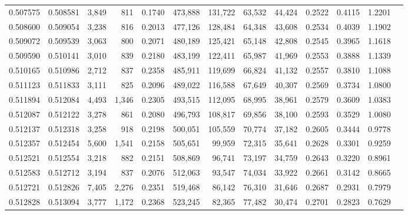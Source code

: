 \begin{tabular}{rrrrrrrrrrrrr}
0.507575 & 0.508581 &  3,849 &   811 &                                     0.1740 & 473,888 & 131,722 &  63,532 &  44,424 & 0.2522 & 0.4115 & 1.2201 \\
0.508600 & 0.509054 &  3,238 &   816 &                                     0.2013 & 477,126 & 128,484 &  64,348 &  43,608 & 0.2534 & 0.4039 & 1.1902 \\
0.509072 & 0.509539 &  3,063 &   800 &                                     0.2071 & 480,189 & 125,421 &  65,148 &  42,808 & 0.2545 & 0.3965 & 1.1618 \\
0.509590 & 0.510141 &  3,010 &   839 &                                     0.2180 & 483,199 & 122,411 &  65,987 &  41,969 & 0.2553 & 0.3888 & 1.1339 \\
0.510165 & 0.510986 &  2,712 &   837 &                                     0.2358 & 485,911 & 119,699 &  66,824 &  41,132 & 0.2557 & 0.3810 & 1.1088 \\
0.511123 & 0.511833 &  3,111 &   825 &                                     0.2096 & 489,022 & 116,588 &  67,649 &  40,307 & 0.2569 & 0.3734 & 1.0800 \\
0.511894 & 0.512084 &  4,493 & 1,346 &                                     0.2305 & 493,515 & 112,095 &  68,995 &  38,961 & 0.2579 & 0.3609 & 1.0383 \\
0.512087 & 0.512122 &  3,278 &   861 &                                     0.2080 & 496,793 & 108,817 &  69,856 &  38,100 & 0.2593 & 0.3529 & 1.0080 \\
0.512137 & 0.512318 &  3,258 &   918 &                                     0.2198 & 500,051 & 105,559 &  70,774 &  37,182 & 0.2605 & 0.3444 & 0.9778 \\
0.512357 & 0.512454 &  5,600 & 1,541 &                                     0.2158 & 505,651 &  99,959 &  72,315 &  35,641 & 0.2628 & 0.3301 & 0.9259 \\
0.512521 & 0.512554 &  3,218 &   882 &                                     0.2151 & 508,869 &  96,741 &  73,197 &  34,759 & 0.2643 & 0.3220 & 0.8961 \\
0.512583 & 0.512712 &  3,194 &   837 &                                     0.2076 & 512,063 &  93,547 &  74,034 &  33,922 & 0.2661 & 0.3142 & 0.8665 \\
0.512721 & 0.512826 &  7,405 & 2,276 &                                     0.2351 & 519,468 &  86,142 &  76,310 &  31,646 & 0.2687 & 0.2931 & 0.7979 \\
0.512828 & 0.513094 &  3,777 & 1,172 &                                     0.2368 & 523,245 &  82,365 &  77,482 &  30,474 & 0.2701 & 0.2823 & 0.7629 \\

\end{tabular}
